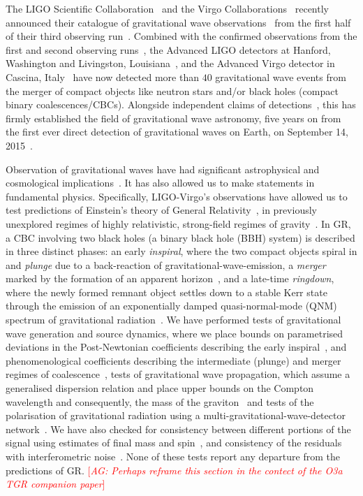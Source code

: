 \documentclass[twocolumn,prd,superscriptaddress,amsfonts,amssymb,amsmath,preprintnumbers]{revtex4-1}
\newcommand{\abhi}[1]{\textcolor{red}{[\textit{AG: #1}]}}
\begin{document}
The LIGO Scientific Collaboration~\citep{lsc} and the Virgo Collaborations~\citep{Virgo} recently announced their catalogue of gravitational wave observations~\citep{GWTC-2} from the first half of their third observing run~\citep{O3reference}. Combined with the confirmed observations from the first and second observing runs~\citep{abbott2019gwtc}, the Advanced LIGO detectors at Hanford, Washington and Livingston, Louisiana~\citep{aasi2015characterization}, and the Advanced Virgo detector in Cascina, Italy~\citep{acernese2014advanced} have now detected more than $40$ gravitational wave events from the merger of compact objects like neutron stars and/or black holes (compact binary coalescences/CBCs). Alongside independent claims of detections~\citep{nitz20191,nitz20202,2019PhRvD.100b3007Z,2020PhRvD.101h3030V,Venumadhav_2020}, this has firmly established the field of gravitational wave astronomy, five years on from the first ever direct detection of gravitational waves on Earth, on September 14, 2015~\citep{abbott2016observation}.
\par
Observation of gravitational waves have had significant astrophysical and cosmological implications~\citep{LSC_2016astroph,gw170817_mma,gw170817_joint,gw170817_hubble}. It has also allowed us to make statements in fundamental physics. Specifically, LIGO-Virgo's observations have allowed us to test predictions of Einstein's theory of General Relativity~\citep[GR]{}, in previously unexplored regimes of highly relativistic, strong-field regimes of gravity~\citep{LSC_2016grtests,GW170817_TGR,gwtc1_tgr}. In GR, a CBC involving two black holes (a binary black hole (BBH) system) is described in three distinct phases: an early \textit{inspiral}, where the two compact objects spiral in and \textit{plunge} due to a back-reaction of gravitational-wave-emission, a \textit{merger} marked by the formation of an apparent horizon~\citep{NRpaper}, and a late-time \textit{ringdown}, where the newly formed remnant object settles down to a stable Kerr state through the emission of an exponentially damped quasi-normal-mode (QNM) spectrum of gravitational radiation~\citep{vishu,earlyqnmpapers}.  We have performed tests of gravitational wave generation and source dynamics, where we place bounds on parametrised deviations in the Post-Newtonian coefficients describing the early inspiral~\citep{earlydevelopmentpapers}, and phenomenological coefficients describing the intermediate (plunge) and merger regimes of coalescence~\citep{TIGERmethodspapers}, tests of gravitational wave propagation, which assume a generalised dispersion relation and place upper bounds on the Compton wavelength and consequently, the mass of the graviton~\citep{gw170104,samajdar2017projected} and tests of the polarisation of gravitational radiation using a multi-gravitational-wave-detector network~\citep{gw170814,isi2017probing}. We have also checked for consistency between different portions of the signal using estimates of final mass and spin~\citep{Ghosh:2016xx,Ghosh:2017gfp,LSC_2016grtests}, and consistency of the residuals with interferometric noise~\citep{Ghonge:2020suv,gwtc1_tgr}. None of these tests report any departure from the predictions of GR. \abhi{Perhaps reframe this section in the contect of the O3a TGR companion paper}
\end{document}

